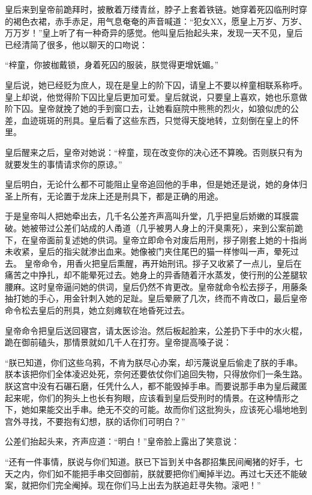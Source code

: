 皇后来到皇帝前跪拜时，披散着万缕青丝，脖子上套着铁链。她穿着死囚临刑时穿的褐色衣裙，赤手赤足，用气息奄奄的声音喊道：“犯女XX，愿皇上万岁、万岁、万万岁！”皇上听了有一种奇异的感觉。他叫皇后抬起头来，发现一天不见，皇后已经清简了很多，他以聊天的口吻说： 

“梓童，你披枷戴锁，身着死囚的服装，朕觉得更增妩媚。” 

皇后说，她已经贬为庶人，现在是皇上的阶下囚，请皇上不要以梓童相联系称呼。皇上却说，他觉得阶下囚比皇后更加可爱。皇后就说，只要皇上喜欢，她也乐意做阶下囚。皇帝就挽了她的手到窗口去，让她看庭院中熊熊的烈火，如狼似虎的公差，血迹斑斑的刑具。皇后看了这些东西，只觉得天旋地转，立刻倒在皇上的怀里。 

皇后醒来之后，皇帝对她说：“梓童，现在改变你的决心还不算晚。否则朕只有为就要发生的事情请求你的原谅。” 

皇后明白，无论什么都不可能阻止皇帝追回他的手串，但是她还是说，她的身体归圣上所有，无论置于龙床上还是刑具下，都是正确的用途。 

于是皇帝叫人把她牵出去，几千名公差齐声高叫升堂，几乎把皇后娇嫩的耳膜震破。她被带过公差们站成的人甬道（几乎被男人身上的汗臭熏死），来到公案前跪下，在皇帝面前复述她的供词。皇帝立即命令对废后用刑，拶子刚套上她的十指尚未收紧，皇后的指尖就渗出血来。她像被门夹住尾巴的猫一样惨叫一声，晕死过去。 皇帝命令，用香火把皇后熏醒，再开始刑讯。拶子又收紧了一点儿，皇后在痛苦之中挣扎，却不能晕死过去。她身上的异香随着汗水蒸发，使行刑的公差腿软腰麻。这时皇帝逼问她的供词，皇后仍然不肯更改。皇帝就命令松去拶子，用藤条抽打她的手心，用金针刺入她的足趾。皇后晕厥了几次，终而不肯改口，最后皇帝命令松去皇后的刑具，她立刻瘫软在地昏死过去。 

皇帝命令把皇后送回寝宫，请太医诊治。然后板起脸来，公差扔下手中的水火棍，跪在御前磕头，那情景就如几千人在打夯。皇帝提高嗓子说： 

“朕已知道，你们这些乌鸦，不肯为朕尽心办案，却污蔑说皇后偷走了朕的手串。朕本该把你们全体凌迟处死，奈何还要依仗你们追回失物，只得放你们一条生路。朕这宫中没有石碾石磨，任凭什么人，都不能毁掉手串。而要说那手串为皇后藏匿起来呢，你们的狗头上也长有狗眼，应该看到皇后受刑时的情景。在这种情形之下，她如果能交出手串。绝无不交的可能。故而你们这批狗头，应该死心塌地地到宫外寻找，不要抱有幻想，朕的话你们可明白？” 

公差们抬起头来，齐声应道：“明白！”皇帝脸上露出了笑意说： 

“还有一件事情，朕说与你们知道。朕已下旨到关中各郡招集民间阉猪的好手，七天之内，你们如不能把手串交回御前，朕就要把你们阉掉半边。再过七天还不能破案，就把你们完全阉掉。现在你们马上出去为朕追赶寻失物。滚吧！” 

